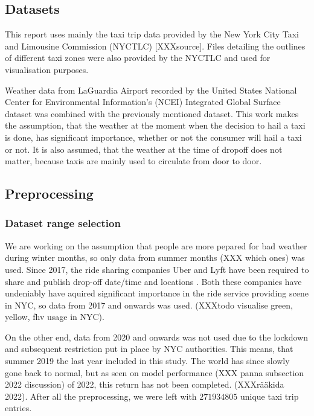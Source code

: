 \documentclass[11pt]{article}
\begin{document}
\subsection{Datasets}
This report uses mainly the taxi trip data provided by the New York City Taxi and Limousine Commission (NYCTLC) [XXXsource]. Files detailing the outlines of different taxi zones were also provided by the NYCTLC and used for visualisation purposes.

Weather data from LaGuardia Airport recorded by the United States National Center for Environmental Information's (NCEI) Integrated Global Surface dataset \cite{weatherData} was combined with the previously mentioned dataset. This work makes the assumption, that the weather at the moment when the decision to hail a taxi is done, has significant importance, whether or not the consumer will hail a taxi or not. It is also assumed, that the weather at the time of dropoff does not matter, because taxis are mainly used to circulate from door to door.

\subsection{Preprocessing}

\subsubsection{Dataset range selection}

We are working on the assumption that people are more pepared for bad weather during winter months, so only data from summer months (XXX which ones) was used. Since 2017, the ride sharing companies Uber and Lyft have been required to share and publish drop-off date/time and locations \cite{tripUserGuide}. Both these companies have undeniably have aquired significant importance in the ride service providing scene in NYC, so data from 2017 and onwards was used. (XXXtodo visualise green, yellow, fhv usage in NYC).

On the other end, data from 2020 and onwards was not used due to the lockdown and subsequent restriction put in place by NYC authorities. This means, that summer 2019 the last year included in this study. The world has since slowly gone back to normal, but as seen on model performance (XXX panna subsection 2022 discussion) of 2022, this return has not been completed. (XXXrääkida 2022). After all the preprocessing, we were left with $271934805$ unique taxi trip entries.
\end{document}
